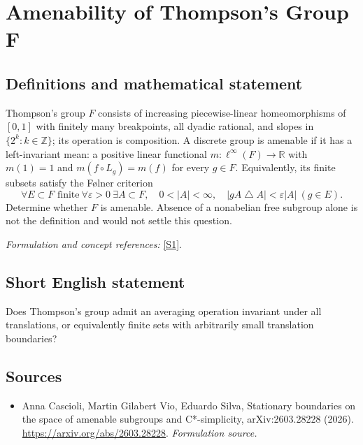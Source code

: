 \documentclass[11pt]{article}
\begin{document}
\section*{\texorpdfstring{Amenability of Thompson's Group F}{Amenability of Thompson's Group F}}\label{304}
\subsection{Definitions and mathematical statement}
Thompson's group $F$ consists of increasing piecewise-linear homeomorphisms of $[0,1]$ with finitely many breakpoints, all dyadic rational, and slopes in $\{2^k:k\in{\mathbb{Z}}\}$; its operation is composition. A discrete group is amenable if it has a left-invariant mean: a positive linear functional $m:\ell^\infty(F)\to{\mathbb{R}}$ with $m(1)=1$ and $m(f\circ L_g)=m(f)$ for every $g\in F$. Equivalently, its finite subsets satisfy the F\o lner criterion
\[
 \forall E\subset F\text{ finite}\ \forall{\varepsilon}>0\ \exists A\subset F,
 \quad0<|A|<\infty,\quad |gA\mathbin{\triangle} A|<{\varepsilon}|A|\ (g\in E).
\]
Determine whether $F$ is amenable. Absence of a nonabelian free subgroup alone is not the definition and would not settle this question.
\par\smallskip\textit{Formulation and concept references:} \href{https://arxiv.org/abs/2603.28228}{[S1]}.

\subsection{Short English statement}
Does Thompson's group admit an averaging operation invariant under all translations, or equivalently finite sets with arbitrarily small translation boundaries?
\subsection{Sources}
\begin{itemize}
\item[S1]Anna Cascioli, Martin Gilabert Vio, Eduardo Silva, Stationary boundaries on the space of amenable subgroups and C*-simplicity, arXiv:2603.28228 (2026).
\url{https://arxiv.org/abs/2603.28228}.
\textit{Formulation source.}
\end{itemize}
\end{document}
